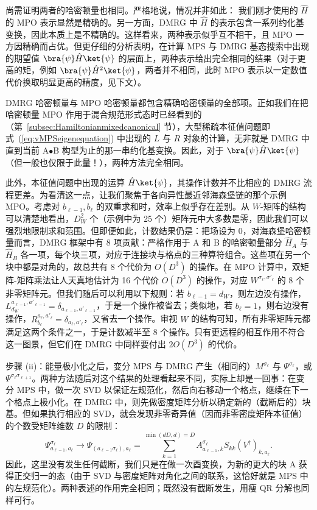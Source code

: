 尚需证明两者的哈密顿量也相同。严格地说，情况并非如此：
我们刚才使用的 $\hat{H}$ 的 MPO 表示显然是精确的。另一方面，DMRG 中 $\hat{H}$ 的表示包含一系列约化基变换，因此本质上是不精确的。这样看来，两种表示似乎互不相干，且 MPO 一方因精确而占优。但更仔细的分析表明，在计算 MPS 与 DMRG 基态搜索中出现的期望值 $\bra{\psi} \hat{H} \ket{\psi}$ 的层面上，两种表示给出完全相同的结果（对于更高的矩，例如 $\bra{\psi} \hat{H}^2 \ket{\psi}$，两者并不相同，此时 MPO 表示以一定数值代价换取明显更高的精度，见下文）。

DMRG 哈密顿量与 MPO 哈密顿量都包含精确哈密顿量的全部项。正如我们在把哈密顿量 MPO 作用于混合规范形式态时已经看到的（第~\ref{subsec:Hamiltonianmixedcanonical} 节），大型稀疏本征值问题即式~(\ref{eq:vMPSeigenequation}) 中出现的 $L$ 与 $R$ 对象的计算，无非就是 DMRG 中直到当前 A$\bullet$B 构型为止的那一串约化基变换。因此，对于 $\bra{\psi} \hat{H} \ket{\psi}$（但一般也仅限于此量！），两种方法完全相同。

此外，本征值问题中出现的运算 $\hat{H}\ket{\psi}$，其操作计数并不比相应的 DMRG 流程更差。为看清这一点，让我们聚焦于各向异性最近邻海森堡链的那个示例 MPO。考虑对 $b_{\ell-1}, b_{\ell}$ 的双重求和时，效率上似乎存在差别。从 $W$-矩阵的结构可以清楚地看出，$D_W^2$ 个（示例中为 25 个）矩阵元中大多数是零，因此我们可以强烈地限制求和范围。但即便如此，计数结果仍是：把场设为 0，对海森堡哈密顿量而言，DMRG 框架中有 8 项贡献：严格作用于 A 和 B 的哈密顿量部分 $\hat{H}_A$ 与 $\hat{H}_B$ 各一项，每个块三项，对应于连接块与格点的三种算符组合。这些项在另一个块中都是对角的，故总共有 8 个代价为 $O(D^3)$ 的操作。在 MPO 计算中，双矩阵-矩阵乘法让人天真地估计为 16 个代价 $O(D^3)$ 的操作，对应 $W^{\sigma_{\ell},\sigma'_{\ell}}$ 的 8 个非零矩阵元。但我们随后可以利用以下规则：若 $b_{\ell-1}=d_W$，则左边没有操作，$L^{a_{\ell-1}, a'_{\ell-1}}_{d_W}= \delta_{a_{\ell-1}, a'_{\ell-1}}$，于是一个操作被省去；类似地，若 $b_{\ell}=1$，则右边没有操作，$R^{a_{\ell},a'_{\ell}}_{b_{\ell}}=\delta_{a_{\ell},a'_{\ell}}$，又省去一个操作。审视 $W$ 的结构可知，所有非零矩阵元都满足这两个条件之一，于是计数减半至 8 个操作。只有更远程的相互作用不符合这一图景，但它们在 DMRG 中同样要付出 $2O(D^3)$ 的代价。

步骤 (ii)：能量极小化之后，变分 MPS 与 DMRG 产生（相同的）$M^{\sigma_\ell}$ 与 $\Psi^{\sigma_\ell}$，或 $\Psi^{\sigma_\ell \sigma_{\ell+1}}$。两种方法随后对这个结果的处理看起来不同，实际上却是一回事：在变分 MPS 中，做一次 SVD 以保证左规范化，然后向右移动一个格点，继续在下一个格点上极小化。在 DMRG 中，则先做密度矩阵分析以确定新的（截断后的）块基。但如果执行相应的 SVD，就会发现非零奇异值（因而非零密度矩阵本征值）的个数受矩阵维数 $D$ 的限制：
\begin{equation}
\Psi^{\sigma_\ell}_{a_{\ell-1},a_ \ell} \rightarrow \Psi_{(a_{\ell-1} \sigma_ \ell), a_ \ell} = \sum_{k=1}^{\min(dD,d)=D} A^{\sigma_ \ell}_{a_{\ell-1},k} S_{kk} (V^\dagger)_{k, a_ \ell} .
\end{equation}
因此，这里没有发生任何截断，我们只是在做一次酉变换，为新的更大的块 A 获得正交归一的态（由于 SVD 与密度矩阵对角化之间的联系，这恰好就是 MPS 中的左规范化）。两种表述的作用完全相同；既然没有截断发生，用瘦 QR 分解也同样可行。

